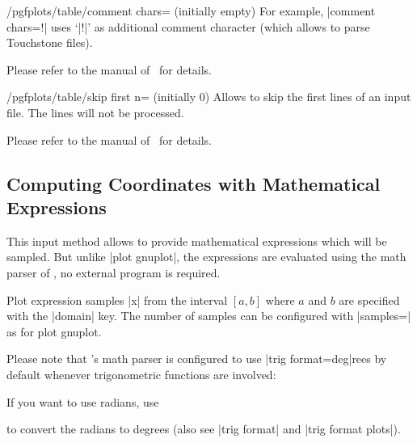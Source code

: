 {\begin{key}{/pgfplots/table/comment chars= (initially empty)}
	For example, |comment chars=!| uses `|!|' as additional comment character (which allows to parse Touchstone files).

	Please refer to the manual of \PGFPlotstable\ for details.
\end{key}

\begin{key}{/pgfplots/table/skip first n= (initially 0)}
	Allows to skip the first  lines of an input file. The lines will not be processed.

	Please refer to the manual of \PGFPlotstable\ for details.
\end{key}


\subsection{Computing Coordinates with Mathematical Expressions}

\begin{addplotoperation}[]{}{}
	This input method allows to provide mathematical expressions which will be sampled. But unlike |plot gnuplot|, the expressions are evaluated using the math parser of \PGF, no external program is required.

	Plot expression samples |x| from the interval $[a,b]$ where $a$ and $b$ are specified with the |domain| key. The number of samples can be configured with |samples=| as for plot gnuplot.

\begin{codeexample}[]
\end{codeexample}

Please note that \PGF's math parser is configured to use |trig format=deg|rees by default whenever trigonometric functions are involved:
\begin{codeexample}[]
\end{codeexample}
\noindent If you want to use radians, use 
\begin{codeexample}[]
\end{codeexample}
\noindent to convert the radians to degrees (also see |trig format| and |trig format plots|).


\end{addplotoperation}}
